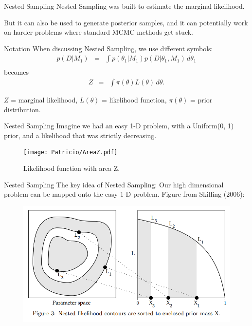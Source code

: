 \begin{frame}{Nested Sampling}
Nested Sampling was built to estimate the marginal likelihood.

But it can also be used to generate posterior samples, and it can potentially
work on harder problems where standard MCMC methods get stuck.
\end{frame}

\begin{frame}[t]{Notation}
When discussing Nested Sampling, we use different symbols:
\begin{eqnarray*}
p(D | M_1) &=& \int p(\theta_1 | M_1) p(D | \theta_1, M_1) \, d\theta_1\\
\end{eqnarray*}
becomes
\begin{eqnarray*}
Z &=& \int \pi(\theta) L(\theta) \, d\theta.
\end{eqnarray*}

$Z$ = marginal likelihood, $L(\theta)$ = likelihood function, $\pi(\theta)$ = prior
distribution.
\end{frame}


\begin{frame}[t]{Nested Sampling}
Imagine we had an easy 1-D problem, with a Uniform(0, 1) prior, and a likelihood
that was strictly decreasing.

\begin{center}
\begin{figure}
	\texttt{[image: Patricio/AreaZ.pdf]}
\caption{Likelihood function with area Z.}
\end{figure}
\end{center}

\end{frame}


\begin{frame}[t]{Nested Sampling}
The key idea of Nested Sampling: Our high dimensional problem can be mapped
onto the easy 1-D problem. Figure from Skilling (2006):

\begin{figure}
\begin{center}
\includegraphics[scale=0.3]{ns.png}
\end{center}
\end{figure}

\end{frame}


